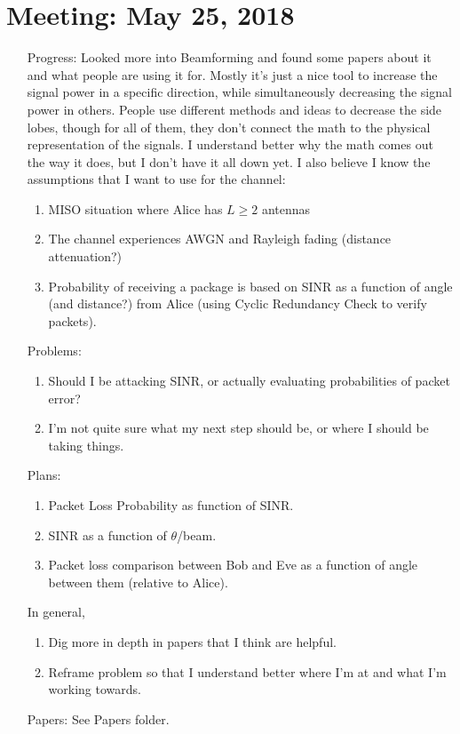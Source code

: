 \documentclass[11pt]{article}
\begin{document}
\section{Meeting: May 25, 2018}
\begin{itemize}
\item[Progress:]
Looked more into Beamforming and found some papers about it and what people are using it for.  Mostly it's just a nice tool to increase the signal power in a specific direction, while simultaneously decreasing the signal power in others.  People use different methods and ideas to decrease the side lobes, though for all of them, they don't connect the math to the physical representation of the signals.  I understand better why the math comes out the way it does, but I don't have it all down yet.\newline
I also believe I know the assumptions that I want to use for the channel:
\begin{enumerate}
\item MISO situation where Alice has $L \geq 2$ antennas
\item The channel experiences AWGN and Rayleigh fading (distance attenuation?)
\item Probability of receiving a package is based on SINR as a function of angle (and distance?) from Alice (using Cyclic Redundancy Check to verify packets).
\end{enumerate}

\item[Problems:]
\begin{enumerate}
\item Should I be attacking SINR, or actually evaluating probabilities of packet error?
\item I'm not quite sure what my next step should be, or where I should be taking things.
\end{enumerate}

\item[Plans:]
\begin{enumerate}
\item Packet Loss Probability as function of SINR.
\item SINR as a function of $\theta$/beam.
\item Packet loss comparison between Bob and Eve as a function of angle between them (relative to 
Alice).
\end{enumerate}
In general,
\begin{enumerate}
\item Dig more in depth in papers that I think are helpful.
\item Reframe problem so that I understand better where I'm at and what I'm working towards.
\end{enumerate}

\item[Papers:]
See Papers folder.

\end{itemize}\newpage
\end{document}
